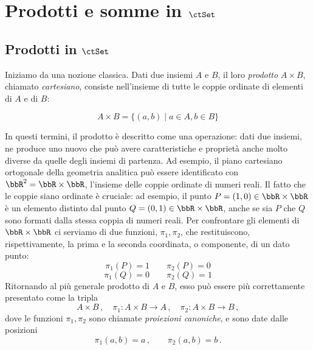 \section{Prodotti e somme in \(\ctSet\)}

\subsection*{Prodotti in \(\ctSet\)}\label{prod_in_Set}

Iniziamo da una nozione classica.
Dati due insiemi \(A\) e \(B\), il loro \emph{prodotto} \(A\times B\), chiamato \emph{cartesiano}, consiste nell'insieme di tutte le coppie ordinate di elementi di \(A\) e di \(B\):

\[
	A\times B= \{(a,b)\mid a\in A, b\in B\}
\]

In questi termini, il prodotto è descritto come una operazione: dati due insiemi, ne produce uno nuovo che può avere caratteristiche e proprietà anche molto diverse da quelle degli insiemi di partenza. Ad esempio, il piano cartesiano ortogonale della geometria analitica può essere identificato con \(\bbR^2=\bbR\times\bbR\), l'insieme delle coppie ordinate di numeri reali. Il fatto che le coppie siano ordinate è cruciale: ad esempio, il punto \(P=(1,0)\in \bbR\times\bbR\) è un elemento distinto dal punto \(Q=(0,1)\in \bbR\times\bbR\), anche se sia \(P\) che \(Q\) sono formati dalla stessa coppia di numeri reali. Per confrontare gli elementi di \(\bbR\times\bbR\) ci serviamo di due funzioni, \(\pi_1,\pi_2\), che restituiscono, rispettivamente, la prima e la seconda coordinata, o componente, di un dato punto:
\[
	\pi_1(P)=1\qquad \pi_2(P)=0
\]
\[
	\pi_1(Q)=0\qquad \pi_2(Q)=1
\]
Ritornando al più generale prodotto di \(A\) e \(B\), esso può essere più correttamente presentato come la tripla
\[
	A\times B\,,\quad \pi_1\colon A\times B\to A\,,\quad \pi_2\colon A\times B\to B\,,
\]
dove le funzioni \(\pi_1,\pi_2\) sono chiamate \emph{proiezioni canoniche}, e sono date dalle posizioni
\[
	\pi_1(a,b)=a\,,\qquad \pi_2(a,b)=b\,.
\]

